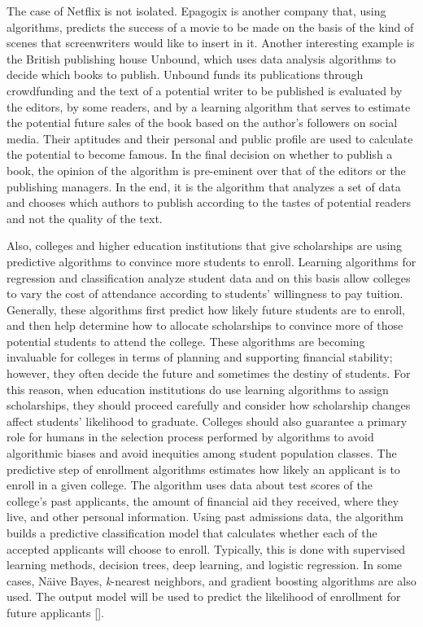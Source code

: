 The case of Netflix is not isolated. Epagogix is another company that, using algorithms, predicts the success of a movie to be made on the basis of the kind of scenes that screenwriters would like to insert in it. Another interesting \hbox{example} is the British publishing house Unbound, which uses data analysis algorithms to decide which books to publish. Unbound funds its publications through crowdfunding and the text of a potential writer to be published is evaluated by the editors, by some readers, and by a learning algorithm that serves to estimate the potential future sales of the book based on the author's followers on social media. Their aptitudes and their personal and public profile are used to calculate the potential to become famous. In the final decision on whether to publish a book, the opinion of the algorithm is pre-eminent over that of the editors or the publishing managers. In the end, it is the algorithm that analyzes a set of data and chooses which authors to publish according to the tastes of potential readers and not the quality of the text.

Also, colleges and higher education institutions that give scholarships are using predictive algorithms to convince more students to enroll. Learning algorithms for regression and classification analyze student data and on this basis allow colleges to vary the cost of attendance according to students' willingness to pay tuition. Generally, these algorithms first predict how likely future students are to enroll, and then help determine how to allocate scholarships to convince more of those potential students to attend the college. These algorithms are becoming invaluable for colleges in terms of planning and supporting financial stability; however, they often decide the future and sometimes the destiny of students. For this reason, when education institutions do use learning algorithms to assign scholarships, they should proceed carefully and consider how scholarship changes affect \hbox{students'} likelihood to graduate. Colleges should also guarantee a primary role for humans in the selection process performed by algorithms to avoid algorithmic biases and avoid inequities among student population classes. The predictive step of enrollment algorithms estimates how likely an applicant is to enroll in a given college. The algorithm uses data about test scores of the college's past applicants, the amount of financial aid they received, where they live, and other personal information. Using past admissions data, the algorithm builds a predictive classification model that calculates whether each of the accepted applicants will choose to enroll. Typically, this is done with supervised learning methods, decision trees, deep learning, and logistic regression. In some cases, N\"{a}ive Bayes, \textit{k}-nearest neighbors, and gradient boosting algorithms are also used. The output model will be used to predict the likelihood of enrollment for future applicants [\citealt{chap:05:Basuetal:2019}].

